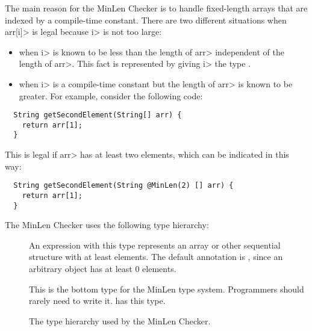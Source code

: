 The main reason for the MinLen Checker is to handle fixed-length arrays
that are indexed by a compile-time constant.
There are two different situations when \<arr[i]> is legal because \<i> is
not too large:
\begin{itemize}
\item
  when \<i> is known to be less than the length of \<arr> independent of the length of
  \<arr>.  This fact is represented by giving \<i> the type .
\item
  when \<i> is a compile-time constant but the length of \<arr> is known to
  be greater.  For example, consider the following code:
\end{itemize}

\begin{Verbatim}
  String getSecondElement(String[] arr) {
    return arr[1];
  }
\end{Verbatim}
  This is legal if \<arr> has at least two elements, which can be indicated
  in this way:
\begin{Verbatim}
  String getSecondElement(String @MinLen(2) [] arr) {
    return arr[1];
  }
\end{Verbatim}

The MinLen Checker uses the following type hierarchy:

\begin{description}
\item[]
  An expression with this type represents an array or other sequential structure
  with at least  elements.  The default annotation is
  , since an arbitrary object has at least 0 elements.
\item[]
  This is the bottom type for the MinLen type system.
  Programmers should rarely need to write it.
   has this type.
  \end{description}

\begin{figure}
  \caption{The type hierarchy used by the MinLen Checker.}
  \label{fig-minlen-types}
\end{figure}
